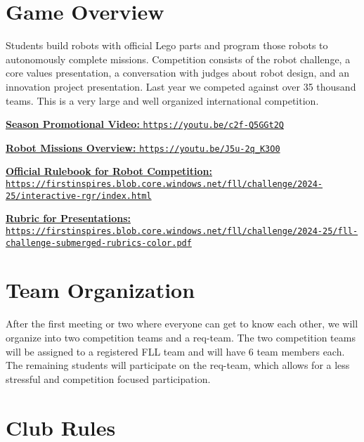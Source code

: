 \documentclass[letter]{article}
\begin{document}
\hypertarget{game-overview}{%
\section{Game Overview}\label{game-overview}}

Students build robots with official Lego parts and program those robots to autonomously complete missions. Competition consists of the robot challenge, a core values presentation, a conversation with judges about robot design, and an innovation project presentation.  Last year we competed against over 35 thousand teams.  This is a very large and well organized international competition.

\href{https://youtu.be/c2f-Q5GGt2Q}{\textbf{Season Promotional Video:} \nolinkurl{https://youtu.be/c2f-Q5GGt2Q}}

\href{https://youtu.be/J5u-2q_K3O0}{\textbf{Robot Missions Overview:} \nolinkurl{https://youtu.be/J5u-2q_K3O0}}

\href{https://firstinspires.blob.core.windows.net/fll/challenge/2024-25/interactive-rgr/index.html}{\textbf{Official Rulebook for Robot Competition:} \nolinkurl{https://firstinspires.blob.core.windows.net/fll/challenge/2024-25/interactive-rgr/index.html}}

\href{https://firstinspires.blob.core.windows.net/fll/challenge/2024-25/fll-challenge-submerged-rubrics-color.pdf}{\textbf{Rubric for Presentations:} \nolinkurl{https://firstinspires.blob.core.windows.net/fll/challenge/2024-25/fll-challenge-submerged-rubrics-color.pdf}}

\section{Team Organization}

After the first meeting or two where everyone can get to know each other, we will organize into two competition teams and a req-team.  The two competition teams will be assigned to a registered FLL team and will have 6 team members each.  The remaining students will participate on the req-team, which allows for a less stressful and competition focused participation.  

\section{Club Rules}
\end{document}
